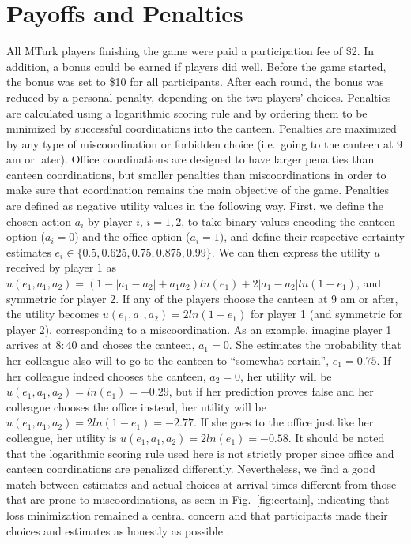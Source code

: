 \documentclass[twocolumn,a4paper,superscriptaddress,nofootinbib]{revtex4}
\begin{document}
\section{Payoffs and Penalties} \label{appendix:payoffs}
 All MTurk players finishing the game were paid a participation fee of \$2. In addition, a bonus could be earned if players did well. Before the game started, the bonus was set to \$10 for all participants. After each round, the bonus was reduced by a personal penalty, depending on the two players' choices. Penalties are calculated using a logarithmic scoring rule and by ordering them to be minimized by successful coordinations into the canteen. Penalties are maximized by any type of miscoordination or forbidden choice (i.e.\ going to the canteen at 9 am or later). Office coordinations are designed to have larger penalties than canteen coordinations, but smaller penalties than miscoordinations in order to make sure that coordination remains the main objective of the game. Penalties are defined as negative utility values in the following way. First, we define the chosen action $a_i$ by player $i$, $i=1,2$, to take binary values encoding the canteen option ($a_i=0$) and the office option ($a_i=1$), and define their respective certainty estimates $e_i \in \{0.5, 0.625, 0.75, 0.875, 0.99\}$. We can then express the utility $u$ received by player $1$ as $u(e_1, a_1, a_2) = (1-|a_1-a_2| + a_1a_2)ln(e_1) + 2|a_1-a_2|ln(1-e_1)$, and symmetric for player 2. If any of the players choose the canteen at 9 am or after, the utility becomes $u(e_1,a_1,a_2) = 2ln(1-e_1)$ for player 1 (and symmetric for player 2), corresponding to a miscoordination. As an example, imagine player 1 arrives at $8{:}40$ and choses the canteen, $a_1=0$. She estimates the probability that her colleague also will to go to the canteen to ``somewhat certain'', $e_1=0.75$. If her colleague indeed chooses the canteen, $a_2=0$, her utility will be $u(e_1,a_1,a_2) = ln(e_1) = -0.29$, but if her prediction proves false and her colleague chooses the office instead, her utility will be $u(e_1,a_1,a_2) = 2ln(1-e_1)=-2.77$. If she goes to the office just like her colleague, her utility is $u(e_1,a_1,a_2) = 2ln(e_1)=-0.58$. It should be noted that the logarithmic scoring rule used here is not strictly proper since office and canteen coordinations are penalized differently. Nevertheless, we find a good match between estimates and actual choices at arrival times different from those that are prone to miscoordinations, as seen in Fig.~\ref{fig:certain}, indicating that loss minimization remained a central concern and that participants made their choices and estimates as honestly as possible \citep{seidenfeld1985calibration,palfrey2009eliciting}.
\end{document}

